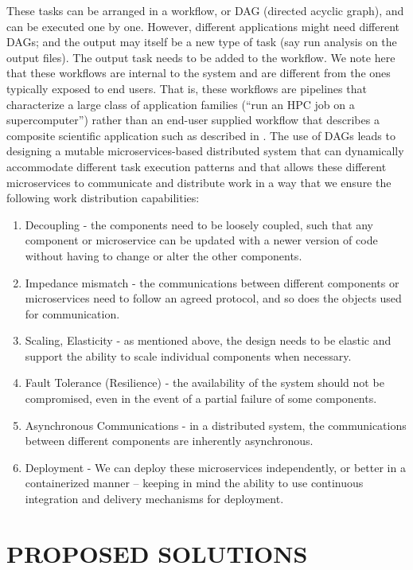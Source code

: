 \documentclass[review]{elsarticle}
\begin{document}
These tasks can be arranged in a workflow, or DAG (directed acyclic graph), and can be executed one by one. However, different applications might need different DAGs; and the output may itself be a new type of task (say run analysis on the output files).  The output task needs to be added to the workflow.  We note here that these workflows are internal to the system and are different from the ones typically exposed to end users. That is, these workflows are pipelines that characterize a large class of application families (``run an HPC job on a supercomputer'') rather than an end-user supplied workflow that describes a composite scientific application such as described in \cite{taylor2014workflows}.
The use of DAGs leads to designing a mutable microservices-based distributed system that can dynamically accommodate different task execution patterns and that allows these different microservices to communicate and distribute work in a way that we ensure the following work distribution capabilities:
\begin{enumerate}
\item Decoupling - the components need to be loosely coupled, such that any component or microservice can be updated with a newer version of code without having to change or alter the other components.
\item Impedance mismatch - the communications between different components or microservices need to follow an agreed protocol, and so does the objects used for communication. 
\item Scaling, Elasticity - as mentioned above, the design needs to be elastic and support the ability to scale individual components when necessary.
\item Fault Tolerance (Resilience) - the availability of the system should not be compromised, even in the event of a partial failure of some components. 
\item Asynchronous Communications - in a distributed system, the communications between different components are inherently asynchronous.
\item Deployment - We can deploy these microservices independently, or better in a containerized manner -- keeping in mind the ability to use continuous integration and delivery mechanisms for deployment.
\end{enumerate}


\section{PROPOSED SOLUTIONS}
\end{document}
